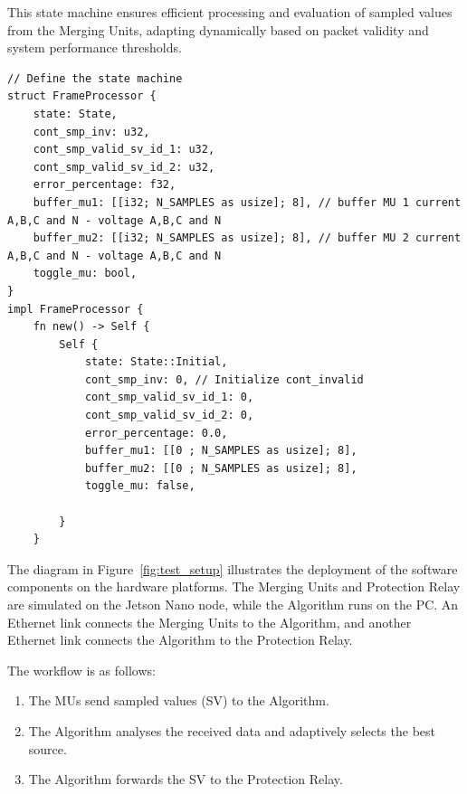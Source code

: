 This state machine ensures efficient processing and evaluation of sampled values from the Merging Units, adapting dynamically based on packet validity and system performance thresholds.

\begin{lstlisting}[caption={State Machine struct.}]
// Define the state machine
struct FrameProcessor {
	state: State,
	cont_smp_inv: u32,
	cont_smp_valid_sv_id_1: u32,
	cont_smp_valid_sv_id_2: u32,
	error_percentage: f32,
	buffer_mu1: [[i32; N_SAMPLES as usize]; 8], // buffer MU 1 current A,B,C and N - voltage A,B,C and N
	buffer_mu2: [[i32; N_SAMPLES as usize]; 8], // buffer MU 2 current A,B,C and N - voltage A,B,C and N
	toggle_mu: bool,
}
impl FrameProcessor {
	fn new() -> Self {
		Self {
			state: State::Initial,
			cont_smp_inv: 0, // Initialize cont_invalid
			cont_smp_valid_sv_id_1: 0,
			cont_smp_valid_sv_id_2: 0,
			error_percentage: 0.0,
			buffer_mu1: [[0 ; N_SAMPLES as usize]; 8],
			buffer_mu2: [[0 ; N_SAMPLES as usize]; 8],
			toggle_mu: false,
			
		}
	}
\end{lstlisting}

The diagram in Figure~\ref{fig:test_setup} illustrates the deployment of the software components on the hardware platforms.
The Merging Units and Protection Relay are simulated on the Jetson Nano node, while the Algorithm runs on the PC.
An Ethernet link connects the Merging Units to the Algorithm, and another Ethernet link connects the Algorithm to the Protection Relay.

The workflow is as follows:
\begin{enumerate}
	\item The MUs send sampled values (SV) to the Algorithm.
	\item The Algorithm analyses the received data and adaptively selects the best source.
	\item The Algorithm forwards the SV to the Protection Relay.
\end{enumerate}


